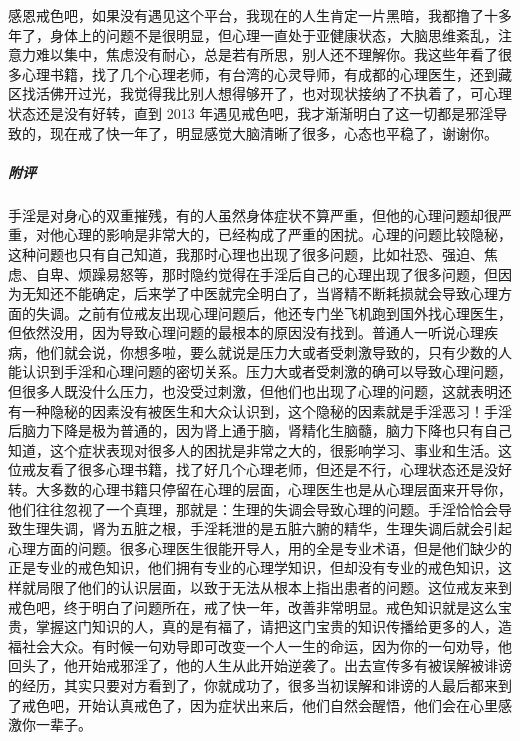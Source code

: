 \begin{case}
    感恩戒色吧，如果没有遇见这个平台，我现在的人生肯定一片黑暗，我都撸了十多年了，身体上的问题不是很明显，但心理一直处于亚健康状态，大脑思维紊乱，注意力难以集中，焦虑没有耐心，总是若有所思，别人还不理解你。我这些年看了很多心理书籍，找了几个心理老师，有台湾的心灵导师，有成都的心理医生，还到藏区找活佛开过光，我觉得我比别人想得够开了，也对现状接纳了不执着了，可心理状态还是没有好转，直到 2013 年遇见戒色吧，我才渐渐明白了这一切都是邪淫导致的，现在戒了快一年了，明显感觉大脑清晰了很多，心态也平稳了，谢谢你。
    \subparagraph{附评} 手淫是对身心的双重摧残，有的人虽然身体症状不算严重，但他的心理问题却很严重，对他心理的影响是非常大的，已经构成了严重的困扰。心理的问题比较隐秘，这种问题也只有自己知道，我那时心理也出现了很多问题，比如社恐、强迫、焦虑、自卑、烦躁易怒等，那时隐约觉得在手淫后自己的心理出现了很多问题，但因为无知还不能确定，后来学了中医就完全明白了，当肾精不断耗损就会导致心理方面的失调。之前有位戒友出现心理问题后，他还专门坐飞机跑到国外找心理医生，但依然没用，因为导致心理问题的最根本的原因没有找到。普通人一听说心理疾病，他们就会说，你想多啦，要么就说是压力大或者受刺激导致的，只有少数的人能认识到手淫和心理问题的密切关系。压力大或者受刺激的确可以导致心理问题，但很多人既没什么压力，也没受过刺激，但他们也出现了心理的问题，这就表明还有一种隐秘的因素没有被医生和大众认识到，这个隐秘的因素就是手淫恶习！手淫后脑力下降是极为普通的，因为肾上通于脑，肾精化生脑髓，脑力下降也只有自己知道，这个症状表现对很多人的困扰是非常之大的，很影响学习、事业和生活。这位戒友看了很多心理书籍，找了好几个心理老师，但还是不行，心理状态还是没好转。大多数的心理书籍只停留在心理的层面，心理医生也是从心理层面来开导你，他们往往忽视了一个真理，那就是：生理的失调会导致心理的问题。手淫恰恰会导致生理失调，肾为五脏之根，手淫耗泄的是五脏六腑的精华，生理失调后就会引起心理方面的问题。很多心理医生很能开导人，用的全是专业术语，但是他们缺少的正是专业的戒色知识，他们拥有专业的心理学知识，但却没有专业的戒色知识，这样就局限了他们的认识层面，以致于无法从根本上指出患者的问题。这位戒友来到戒色吧，终于明白了问题所在，戒了快一年，改善非常明显。戒色知识就是这么宝贵，掌握这门知识的人，真的是有福了，请把这门宝贵的知识传播给更多的人，造福社会大众。有时候一句劝导即可改变一个人一生的命运，因为你的一句劝导，他回头了，他开始戒邪淫了，他的人生从此开始逆袭了。出去宣传多有被误解被诽谤的经历，其实只要对方看到了，你就成功了，很多当初误解和诽谤的人最后都来到了戒色吧，开始认真戒色了，因为症状出来后，他们自然会醒悟，他们会在心里感激你一辈子。
\end{case}

